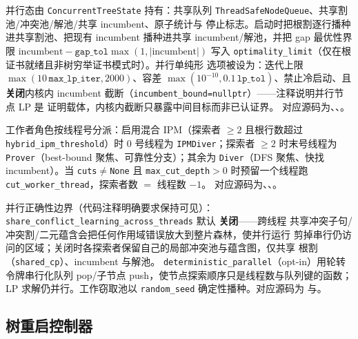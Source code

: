 并行态由 \texttt{ConcurrentTreeState} 持有：共享队列
\texttt{ThreadSafeNodeQueue}、共享割池/冲突池/解池/共享 incumbent、原子统计与
停止标志。启动时把根割逐行播种进共享割池、把现有 incumbent 播种进共享
incumbent/解池，并把 gap 最优性界限
$\mathrm{incumbent}-\texttt{gap\_tol}\max(1,|\mathrm{incumbent}|)$ 写入
\texttt{optimality\_limit}（仅在根证书就绪且非树穷举证书模式时）。并行单纯形
选项被设为：迭代上限 $\max(10\,\texttt{max\_lp\_iter},2000)$、容差
$\max(10^{-10},0.1\,\texttt{lp\_tol})$、禁止冷启动、且\textbf{关闭}内核内
incumbent 截断（\texttt{incumbent\_bound=nullptr}）——注释说明并行节点 LP 是
证明载体，内核内截断只暴露中间目标而非已认证界。
对应源码为、、。

工作者角色按线程号分派：启用混合 IPM（探索者 $\ge2$ 且根行数超过
\texttt{hybrid\_ipm\_threshold}）时 0 号线程为 \texttt{IPMDiver}；探索者
$\ge2$ 时末号线程为 \texttt{Prover}（best-bound 聚焦、可靠性分支）；其余为
\texttt{Diver}（DFS 聚焦、快找 incumbent）。当
\texttt{cuts}$\ne$\texttt{None} 且 \texttt{max\_cut\_depth}$>0$ 时预留一个线程跑
\texttt{cut\_worker\_thread}，探索者数 $=$ 线程数 $-1$。
对应源码为、、。

\begin{boundarynote}
并行正确性边界（代码注释明确要求保持可见）：
\texttt{share\_conflict\_learning\_across\_threads} 默认 \textbf{关闭}——跨线程
共享冲突子句/冲突割/二元蕴含会把任何作用域错误放大到整片森林，使并行运行
剪掉串行仍访问的区域；关闭时各探索者保留自己的局部冲突池与蕴含图，仅共享
根割（\texttt{shared\_cp}）、incumbent 与解池。
\texttt{deterministic\_parallel}（opt-in）用轮转令牌串行化队列 pop/子节点
push，使节点探索顺序只是线程数与队列键的函数；LP 求解仍并行。工作窃取池以
\texttt{random\_seed} 确定性播种。对应源码为 与。
\end{boundarynote}

\subsection{树重启控制器}\label{subsec:milpbc-tree}


